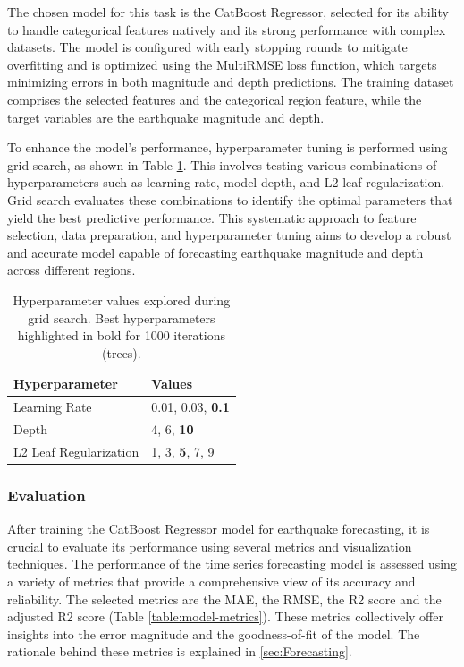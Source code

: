 The chosen model for this task is the CatBoost Regressor, selected for its
ability to handle categorical features natively and its strong performance
with complex datasets. The model is configured with early stopping rounds to
mitigate overfitting and is optimized using the MultiRMSE loss function, which
targets minimizing errors in both magnitude and depth predictions. The training
dataset comprises the selected features and the categorical region feature,
while the target variables are the earthquake magnitude and depth.

To enhance the model's performance, hyperparameter tuning is performed using
grid search, as shown in Table \ref{table:hyperparameters}. This involves
testing various combinations of hyperparameters
such as learning rate, model depth, and L2 leaf regularization. Grid
search evaluates these combinations to identify the optimal parameters that
yield the best predictive performance. This systematic approach to feature
selection, data preparation, and hyperparameter tuning aims to develop a
robust and accurate model capable of forecasting earthquake magnitude and
depth across different regions.

\begin{table}[h!]
  \centering
  \begin{tabular}{ll}
    \toprule
    \textbf{Hyperparameter} & \textbf{Values}          \\ \midrule
    Learning Rate           & 0.01, 0.03, \textbf{0.1} \\ \midrule
    Depth                   & 4, 6, \textbf{10}        \\ \midrule
    L2 Leaf Regularization  & 1, 3, \textbf{5}, 7, 9   \\ \bottomrule
  \end{tabular}
  \caption{Hyperparameter values explored during grid search. Best hyperparameters highlighted in bold
    for 1000 iterations (trees).}
  \label{table:hyperparameters}
\end{table}

\subsubsection{Evaluation}
After training the CatBoost Regressor model for earthquake forecasting,
it is crucial to evaluate its performance using several metrics and visualization techniques.
The performance of the time series forecasting model is assessed using a variety of
metrics that provide a comprehensive view of its accuracy and reliability. The selected
metrics are the \ac{MAE}, the \ac{RMSE}, the R2 score and the adjusted R2 score
(Table \ref{table:model-metrics}).
These metrics collectively offer insights into the error magnitude and the goodness-of-fit
of the model. The rationale behind these metrics is explained in \ref{sec:Forecasting}.

